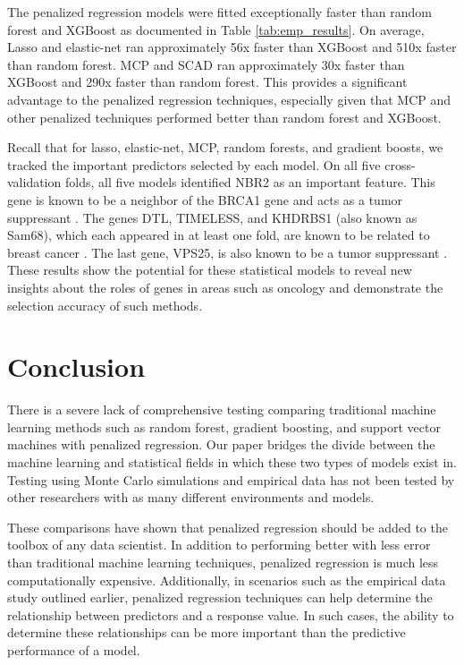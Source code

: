 \documentclass[final,onefignum,onetabnum]{siuro210301}
\begin{document}
	The penalized regression models were fitted exceptionally faster than random forest and XGBoost as documented in Table \ref{tab:emp_results}. On average, Lasso and elastic-net ran approximately 56x faster than XGBoost and 510x faster than random forest. MCP and SCAD ran approximately 30x faster than XGBoost and 290x faster than random forest. This provides a significant advantage to the penalized regression techniques, especially given that MCP and other penalized techniques performed better than random forest and XGBoost.

	Recall that for lasso, elastic-net, MCP, random forests, and gradient boosts, we tracked the important predictors selected by each model. On all five cross-validation folds, all five models identified NBR2 as an important feature. This gene is known to be a neighbor of the BRCA1 gene and acts as a tumor suppressant  \cite{xiao2016nbr2}. The genes DTL, TIMELESS, and KHDRBS1 (also known as Sam68), which each appeared in at least one fold, are  known to be related to breast cancer \cite{ueki2008involvement, fu2012genetic, bielli2011rna}. The last gene, VPS25, is also known to be a tumor suppressant \cite{vaccari2005drosophila}. These results show the potential for these statistical models to reveal new insights about the roles of genes in areas such as oncology and demonstrate the selection accuracy of such methods.
	
	\section{Conclusion}\label{sec:conclusion}
	
	There is a severe lack of comprehensive testing comparing traditional machine learning methods such as random forest, gradient boosting, and support vector machines with penalized regression. Our paper bridges the divide between the machine learning and statistical fields in which these two types of models exist in. Testing using Monte Carlo simulations and empirical data has not been tested by other researchers with as many different environments and models.
	
	These comparisons have shown that penalized regression should be added to the toolbox of any data scientist. In addition to performing better with less error than traditional machine learning techniques, penalized regression is much less computationally expensive. Additionally, in scenarios such as the empirical data study outlined earlier, penalized regression techniques can help determine the relationship between predictors and a response value. In such cases, the ability to determine these relationships can be more important than the predictive performance of a model.
	
\end{document}
